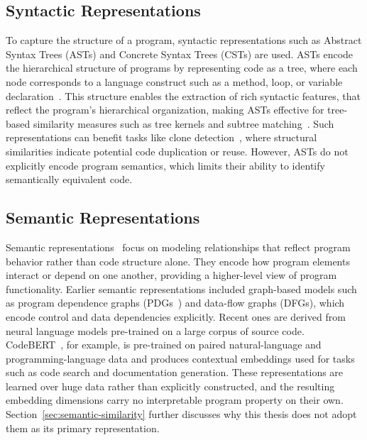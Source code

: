 \documentclass[\main/thesis.tex]{subfiles}
\begin{document}
\subsection{Syntactic Representations}
To capture the structure of a program, syntactic representations such as Abstract Syntax Trees (ASTs) and Concrete Syntax Trees (CSTs) are used. ASTs encode the hierarchical structure of programs by representing code as a tree, where each node corresponds to a language construct such as a method, loop, or variable declaration~\cite{neamtiu2005understanding}. This structure enables the extraction of rich syntactic features, that reflect the program's hierarchical organization, making ASTs effective for tree-based similarity measures such as tree kernels and subtree matching~\cite{tufano2018deep}. Such representations can benefit tasks like clone detection~\cite{deckard2007}, where structural similarities indicate potential code duplication or reuse. However, ASTs do not explicitly encode program semantics, which limits their ability to identify semantically equivalent code.

\subsection{Semantic Representations} 
Semantic representations~\cite{efstathiou2019semantic} focus on modeling relationships that reflect program behavior rather than code structure alone. They encode how program elements interact or depend on one another, providing a higher-level view of program functionality. Earlier semantic representations included graph-based models such as program dependence graphs (PDGs~\cite{komondoor2001using}) and data-flow graphs (DFGs), which encode control and data dependencies explicitly. Recent ones are derived from neural language models pre-trained on a large corpus of source code. CodeBERT~\cite{feng2020codebert}, for example, is pre-trained on paired natural-language and programming-language data and produces contextual embeddings used for tasks such as code search and documentation generation. These representations are learned over huge data rather than explicitly constructed, and the resulting embedding dimensions carry no interpretable program property on their own. Section~\ref{sec:semantic-similarity} further discusses why this thesis does not adopt them as its primary representation.

\end{document}
